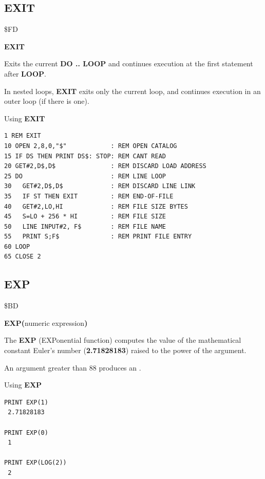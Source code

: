 \subsection{EXIT}
\begin{description}[leftmargin=2cm,style=nextline]
\item [Token:] \$FD
\item [Format:] {\bf EXIT}
\item [Usage:] Exits the current {\bf DO .. LOOP}
               and continues execution at the first
               statement after {\bf LOOP}.

\item [Remarks:] In nested loops, {\bf EXIT} exits only the current loop,
               and continues execution in an outer loop (if there is one).
\item [Example:] Using {\bf EXIT}
\begin{tcolorbox}[colback=black,coltext=white]
\verbatimfont{\codefont}
\begin{verbatim}
1 REM EXIT
10 OPEN 2,8,0,"$"            : REM OPEN CATALOG
15 IF DS THEN PRINT DS$: STOP: REM CANT READ
20 GET#2,D$,D$               : REM DISCARD LOAD ADDRESS
25 DO                        : REM LINE LOOP
30   GET#2,D$,D$             : REM DISCARD LINE LINK
35   IF ST THEN EXIT         : REM END-OF-FILE
40   GET#2,LO,HI             : REM FILE SIZE BYTES
45   S=LO + 256 * HI         : REM FILE SIZE
50   LINE INPUT#2, F$        : REM FILE NAME
55   PRINT S;F$              : REM PRINT FILE ENTRY
60 LOOP
65 CLOSE 2
\end{verbatim}
\end{tcolorbox}
\end{description}


\newpage
\subsection{EXP}
\begin{description}[leftmargin=2cm,style=nextline]
\item [Token:] \$BD
\item [Format:] {\bf EXP(}numeric expression{\bf)}
\item [Usage:] The {\bf EXP} (EXPonential function) computes
               the value of the mathematical constant
               Euler's number ({\bf 2.71828183})
               raised to the power of the
               argument.

\item [Remarks:] An argument greater than 88 produces
                 an .
\item [Examples:] Using {\bf EXP}
\begin{tcolorbox}[colback=black,coltext=white]
\verbatimfont{\codefont}
\begin{verbatim}
PRINT EXP(1)
 2.71828183

PRINT EXP(0)
 1

PRINT EXP(LOG(2))
 2
\end{verbatim}
\end{tcolorbox}
\end{description}

